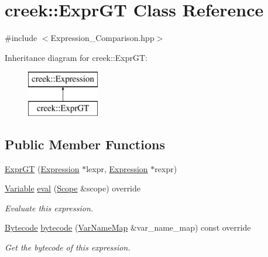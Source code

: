 \hypertarget{classcreek_1_1_expr_g_t}{}\section{creek\+:\+:Expr\+GT Class Reference}
\label{classcreek_1_1_expr_g_t}


{\ttfamily \#include $<$Expression\+\_\+\+Comparison.\+hpp$>$}

Inheritance diagram for creek\+:\+:Expr\+GT\+:\begin{figure}[H]
\begin{center}
\leavevmode
\includegraphics[height=2.000000cm]{classcreek_1_1_expr_g_t}
\end{center}
\end{figure}
\subsection*{Public Member Functions}
\begin{DoxyCompactItemize}
\item 
\hyperlink{classcreek_1_1_expr_g_t_a213248f67e90f13a1859b21f21de70b9}{Expr\+GT} (\hyperlink{classcreek_1_1_expression}{Expression} $\ast$lexpr, \hyperlink{classcreek_1_1_expression}{Expression} $\ast$rexpr)
\item 
\hyperlink{classcreek_1_1_variable}{Variable} \hyperlink{classcreek_1_1_expr_g_t_a8207afd8212d5601ff92debfeee6330c}{eval} (\hyperlink{classcreek_1_1_scope}{Scope} \&scope) override
\begin{DoxyCompactList}\small\item\em Evaluate this expression. \end{DoxyCompactList}\item 
\hyperlink{classcreek_1_1_bytecode}{Bytecode} \hyperlink{classcreek_1_1_expr_g_t_a0eda241e2dd10848b1a3a2097ff56cb3}{bytecode} (\hyperlink{classcreek_1_1_var_name_map}{Var\+Name\+Map} \&var\+\_\+name\+\_\+map) const  override\hypertarget{classcreek_1_1_expr_g_t_a0eda241e2dd10848b1a3a2097ff56cb3}{}\label{classcreek_1_1_expr_g_t_a0eda241e2dd10848b1a3a2097ff56cb3}

\begin{DoxyCompactList}\small\item\em Get the bytecode of this expression. \end{DoxyCompactList}\end{DoxyCompactItemize}


